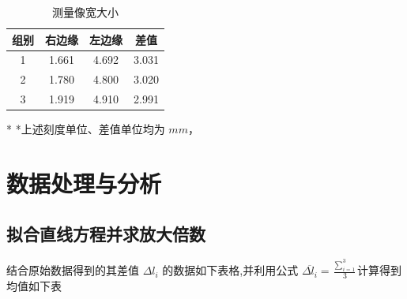 \documentclass[UTF8]{ctexart}
\begin{document}
\begin{table}[H]
    \centering
    \caption{测量像宽大小}
    \begin{tabular}{c|c|c|c}
    \toprule[1pt]
       组别  &   右边缘 & 左边缘 & 差值 \\
    \midrule
       1  &  1.661 & 4.692 & 3.031 \\
    \midrule
       2  & 1.780  & 4.800 & 3.020 \\
    \midrule
       3  & 1.919 & 4.910 & 2.991 \\
    \bottomrule[1pt]
    \end{tabular}
\end{table}
\begin{tablenotes}
\centering
    \footnotesize
    \item[*] *上述刻度单位、差值单位均为 $mm$，
\end{tablenotes}

\newpage


\section{数据处理与分析}
\subsection{拟合直线方程并求放大倍数}
结合原始数据得到的其差值 $\Delta l_i$ 的数据如下表格,并利用公式 $\overline{\Delta l_i} = \frac{\sum_{i=1}^{3}}{3}$计算得到均值如下表
\end{document}

